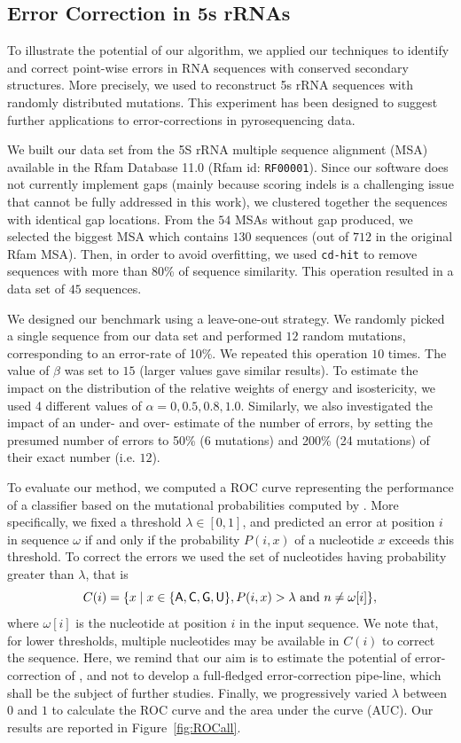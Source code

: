 \subsection{Error Correction in 5s rRNAs}
\label{sec:5S}
To illustrate the potential of our algorithm, we applied our techniques to identify and correct point-wise errors in RNA sequences
with conserved secondary structures. More precisely, we used \RNApyro to reconstruct 5s rRNA sequences with randomly distributed
mutations. This experiment has been designed to suggest further applications to error-corrections in pyrosequencing data.

We built our data set from the 5S rRNA multiple sequence alignment (MSA) available in the Rfam Database 11.0 (Rfam id: \texttt{RF00001}).
Since our software does not currently implement gaps (mainly because scoring indels is a challenging issue that cannot be fully addressed
in this work),  we clustered together the sequences with identical gap locations. From the $54$ MSAs without gap produced, we selected the
biggest MSA  which contains $130$ sequences (out of $712$ in the original Rfam MSA). Then, in order to avoid overfitting, we used \texttt{cd-hit}
\cite{Li:2006fk} to remove sequences with more than 80\% of sequence similarity. This operation resulted in a data set of $45$ sequences. 

We designed our benchmark using a leave-one-out strategy. We randomly picked a single sequence from our data set and performed $12$ random
mutations, corresponding to an error-rate of 10\%. We repeated this operation $10$ times. The value of $\beta$ was set to $15$ (larger values gave similar results). 
To estimate the impact on the distribution of the relative weights of energy and isostericity, we used 4 different values of $\alpha = {0, 0.5, 0.8, 1.0}$. 
Similarly, we also investigated the impact of an under- and over- estimate of the number of errors, by setting the presumed number of errors to 50\% (6 mutations) and 200\% (24 mutations) of their exact number (i.e. $12$).

To evaluate our method, we computed a ROC curve representing the performance of a classifier based on the mutational probabilities computed
by \RNApyro. More specifically, we fixed a threshold $\lambda \in [0,1]$, and predicted an error at position $i$ in sequence $\omega$ if and only if the
probability $P(i,x)$ of a nucleotide $x$ exceeds this threshold. To correct the errors we used the set of nucleotides having probability
greater than $\lambda$, that is  
$$C(i) = \{ x \; | \;  x \in \{ {\sf{A}},{\sf{C}},{\sf{G}},{\sf{U}} \}, P(i,x) > \lambda \mbox{ and }  n \neq \omega[i] \},$$
 where $\omega[i]$ is
the nucleotide at position $i$ in the input sequence. We note that, for lower thresholds, multiple nucleotides may be available in $C(i)$ to correct
the sequence. Here, we remind that our aim is to estimate the potential of error-correction of \RNApyro, and not to develop a full-fledged error-correction pipe-line, which  
shall be the subject of further studies. Finally, we progressively varied $\lambda$ between $0$ and $1$ to calculate the ROC curve and the area
under the curve (AUC). Our results are reported in Figure~\ref{fig:ROCall}. 

